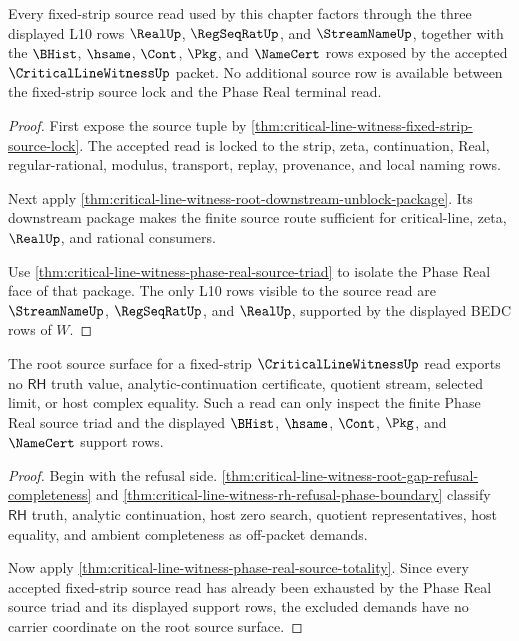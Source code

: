 \begin{theorem}
\label{thm:critical-line-witness-phase-real-source-totality}
Every fixed-strip source read used by this chapter factors through the three displayed L10 rows $\RealUp$, $\RegSeqRatUp$, and $\StreamNameUp$, together with the $\BHist$, $\hsame$, $\Cont$, $\Pkg$, and $\NameCert$ rows exposed by the accepted $\CriticalLineWitnessUp$ packet. No additional source row is available between the fixed-strip source lock and the Phase Real terminal read.
\end{theorem}
\begin{proof}
First expose the source tuple by \autoref{thm:critical-line-witness-fixed-strip-source-lock}. The accepted read is locked to the strip, zeta, continuation, Real, regular-rational, modulus, transport, replay, provenance, and local naming rows.

Next apply \autoref{thm:critical-line-witness-root-downstream-unblock-package}. Its downstream package makes the finite source route sufficient for critical-line, zeta, $\RealUp$, and rational consumers.

Use \autoref{thm:critical-line-witness-phase-real-source-triad} to isolate the Phase Real face of that package. The only L10 rows visible to the source read are $\StreamNameUp$, $\RegSeqRatUp$, and $\RealUp$, supported by the displayed BEDC rows of $W$.
\end{proof}

\begin{theorem}
\label{thm:critical-line-witness-phase-real-source-nonescape}
The root source surface for a fixed-strip $\CriticalLineWitnessUp$ read exports no $\mathsf{RH}$ truth value, analytic-continuation certificate, quotient stream, selected limit, or host complex equality. Such a read can only inspect the finite Phase Real source triad and the displayed $\BHist$, $\hsame$, $\Cont$, $\Pkg$, and $\NameCert$ support rows.
\end{theorem}
\begin{proof}
Begin with the refusal side. \autoref{thm:critical-line-witness-root-gap-refusal-completeness} and \autoref{thm:critical-line-witness-rh-refusal-phase-boundary} classify $\mathsf{RH}$ truth, analytic continuation, host zero search, quotient representatives, host equality, and ambient completeness as off-packet demands.

Now apply \autoref{thm:critical-line-witness-phase-real-source-totality}. Since every accepted fixed-strip source read has already been exhausted by the Phase Real source triad and its displayed support rows, the excluded demands have no carrier coordinate on the root source surface.
\end{proof}
